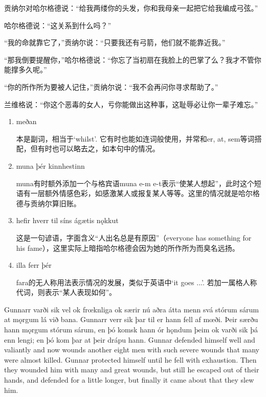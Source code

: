 \begin{translation*}{}
    贡纳尔对哈尔格德说：“给我两缕你的头发，你和我母亲一起把它给我编成弓弦。”

    哈尔格德说：“这关系到什么吗？”

    “我的命就靠它了，”贡纳尔说：“只要我还有弓箭，他们就不能靠近我。”

    “那我倒要提醒你，”哈尔格德说：“你忘了当初扇在我脸上的巴掌了么？我才不管你能撑多久呢。”

    “你的所作所为要被人记住，”贡纳尔说：“我不会再问你寻求帮助了。”

    兰维格说：“你这个恶毒的女人，亏你能做出这种事，这耻辱必让你一辈子难忘。”
\end{translation*}
\begin{grammar*}{}
    \begin{enumerate}[leftmargin=*]
        \item meðan

              本是副词，相当于`whilst'. 它有时也能如连词般使用，并常和er, at, sem等词搭配，但有时也可以略去之，如本句中的情况。

        \item muna þér kinnhestinn

              muna有时额外添加一个与格宾语muna e-m e-t表示“使某人想起”，此时这个短语有一层额外情感色彩，如感激某人或报复某人等等。这里的情况就是哈尔格德与贡纳尔算旧账。

        \item hefir hverr til síns ágætis nǫkkut

              这是一句谚语，字面含义“人出名总是有原因”（everyone has something for his fame），这里实际上暗指哈尔格德会因为她的所作所为而臭名远扬。

        \item illa ferr þér

              fara的无人称用法表示情况的发展，类似于英语中`it goes ...'. 若加一属格人称代词，则表示“某人表现如何”。
    \end{enumerate}
\end{grammar*}
\begin{paracol}{2}
    Gunnarr varði sik vel ok frœknliga ok særir nú aðra átta menn svá stórum sárum at mǫrgum lá við bana. Gunnarr verr sik þar til er hann fell af mœði. Þeir særðu hann mǫrgum stórum sárum, en þó komsk hann ór hǫndum þeim ok varði sik þá enn lengi; en þó kom þar at þeir drápu hann.
    \switchcolumn
    Gunnar defended himself well and valiantly and now wounds another eight men with such severe wounds that many were almost killed. Gunnar protected himself until he fell with exhaustion. Then they wounded him with many and great wounds, but still he escaped out of their hands, and defended for a little longer, but finally it came about that they slew him.
\end{paracol}
